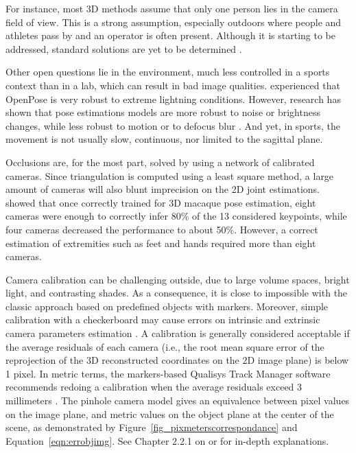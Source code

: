 For instance, most 3D methods assume that only one person lies in the camera field of view. This is a strong assumption, especially outdoors where people and athletes pass by and an operator is often present. Although it is starting to be addressed, standard solutions are yet to be determined \cite{Slembrouck2020,Bridgeman2019, Chu2021, Dong2019}. 

Other open questions lie in the environment, much less controlled in a sports context than in a lab, which can result in bad image qualities. \cite{Viswakumar2019} experienced that OpenPose is very robust to extreme lightning conditions. However, research has shown that pose estimations models are more robust to noise or brightness changes, while less robust to motion or to defocus blur \cite{Wang2021b}. And yet, in sports, the movement is not usually slow, continuous, nor limited to the sagittal plane.

Occlusions are, for the most part, solved by using a network of calibrated cameras. Since triangulation is computed using a least square method, a large amount of cameras will also blunt imprecision on the 2D joint estimations. \cite{Bala2020} showed that once correctly trained for 3D macaque pose estimation, eight cameras were enough to correctly infer 80\% of the 13 considered keypoints, while four cameras decreased the performance to about 50\%. However, a correct estimation of extremities such as feet and hands required more than eight cameras.

Camera calibration can be challenging outside, due to large volume spaces, bright light, and contrasting shades. As a consequence, it is close to impossible with the classic approach based on predefined objects with markers. Moreover, simple calibration with a checkerboard may cause errors on intrinsic and extrinsic camera parameters estimation \cite{Sun2005}. A calibration is generally considered acceptable if the average residuals of each camera (i.e., the root mean square error of the reprojection of the 3D reconstructed coordinates on the 2D image plane) is below 1 pixel. In metric terms, the markers-based Qualisys Track Manager software recommends redoing a calibration when the average residuals exceed 3 millimeters \cite{QTM2018}. The pinhole camera model gives an equivalence between pixel values on the image plane, and metric values on the object plane at the center of the scene, as demonstrated by Figure~\ref{fig_pixmeterscorrespondance} and Equation~\ref{eqn:errobjimg}. See Chapter 2.2.1 on  or \cite{Dawson-Howe1994} for in-depth explanations.

